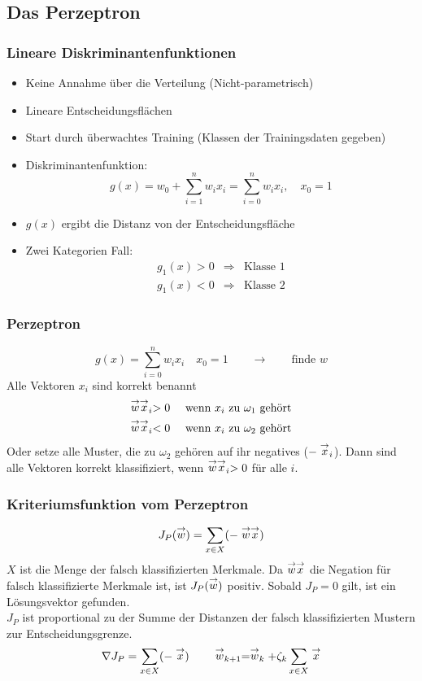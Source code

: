 \subsection{Das Perzeptron}


\subsubsection*{Lineare Diskriminantenfunktionen}

\begin{itemize}
\item Keine Annahme über die Verteilung (Nicht-parametrisch)
\item Lineare Entscheidungsflächen
\item Start durch überwachtes Training (Klassen der Trainingsdaten gegeben)
\item Diskriminantenfunktion: $$g(x) = w_0 + \sum\limits_{i=1}^n w_ix_i = \sum\limits_{i=0}^n w_ix_i, \quad x_0 = 1$$
\item $g(x)$ ergibt die Distanz von der Entscheidungsfläche
\item Zwei Kategorien Fall:
\begin{eqnarray*}
g_1(x) > 0 &\Rightarrow& \textrm{Klasse 1} \\ g_1(x) < 0 &\Rightarrow& \textrm{Klasse 2}
\end{eqnarray*}
\end{itemize}

\subsubsection*{Perzeptron}

$$g(x) = \sum\limits_{i=0}^n w_i x_i \quad x_0 = 1 \qquad \to \qquad \textrm{finde } w$$
Alle Vektoren $x_i$ sind korrekt benannt
\begin{eqnarray*}
\stackrel{\to}{w}\stackrel{\to}{x}_i > 0 && \textrm{ wenn } x_i \textrm{ zu } \omega_1 \textrm{ gehört} \\ \stackrel{\to}{w}\stackrel{\to}{x}_i < 0 && \textrm{ wenn } x_i \textrm{ zu } \omega_2 \textrm{ gehört}
\end{eqnarray*}
Oder setze alle Muster, die zu $\omega_2$ gehören auf ihr negatives ($-\stackrel{\to}{x}_i$). Dann sind alle Vektoren korrekt klassifiziert, wenn $\stackrel{\to}{w} \stackrel{\to}{x}_i > 0$ für alle $i$.
\subsubsection*{Kriteriumsfunktion vom Perzeptron}
$$J_P(\stackrel{\to}{w}) = \sum\limits_{x \in X} (- \stackrel{\to}{w} \stackrel{\to}{x})$$
$X$ ist die Menge der falsch klassifizierten Merkmale. Da $\stackrel{\to}{w} \stackrel{\to}{x}$ die Negation für falsch klassifizierte Merkmale ist, ist $J_P(\stackrel{\to}{w})$ positiv. Sobald $J_P = 0$ gilt, ist ein Lösungsvektor gefunden. \\ $J_P$ ist proportional zu der Summe der Distanzen der falsch klassifizierten Mustern zur Entscheidungsgrenze.
$$\nabla J_P = \sum\limits_{x \in X} (- \stackrel{\to}{x}) \qquad \stackrel{\to}{w}_{k+1} = \stackrel{\to}{w}_k + \zeta_k \sum\limits_{x \in X} \stackrel{\to}{x}$$


